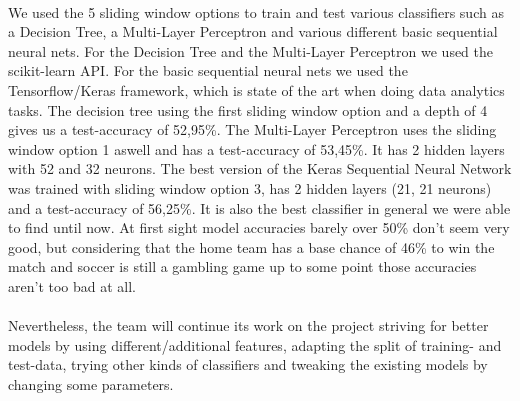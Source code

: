 \\
We used the 5 sliding window options to train and test various classifiers such as a Decision Tree, a Multi-Layer Perceptron and various different basic sequential neural nets. For the Decision Tree and the Multi-Layer Perceptron we used the scikit-learn API. For the basic sequential neural nets we used the Tensorflow/Keras framework, which is state of the art when doing data analytics tasks.\newline
The decision tree using the first sliding window option and a depth of 4 gives us a test-accuracy of 52,95\%. The Multi-Layer Perceptron uses the sliding window option 1 aswell and has a test-accuracy of 53,45\%. It has 2 hidden layers with 52 and 32 neurons. The best version of the Keras Sequential Neural Network was trained with sliding window option 3, has 2 hidden layers (21, 21 neurons) and a test-accuracy of 56,25\%. It is also the best classifier in general we were able to find until now. At first sight model accuracies barely over 50\% don't seem very good, but considering that the home team has a base chance of 46\% to win the match and soccer is still a gambling game up to some point those accuracies aren't too bad at all.\\
\\
Nevertheless, the team will continue its work on the project striving for better models by using different/additional features, adapting the split of training- and test-data, trying other kinds of classifiers and tweaking the existing models by changing some parameters.